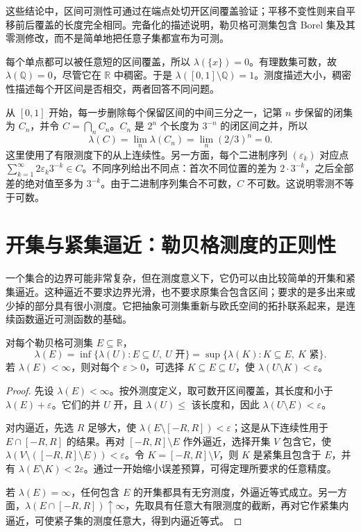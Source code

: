 这些结论中，区间可测性可通过在端点处切开区间覆盖验证；平移不变性则来自平移前后覆盖的长度完全相同。完备化的描述说明，勒贝格可测集包含 Borel 集及其零测修改，而不是简单地把任意子集都宣布为可测。

\begin{example}[稠密性与测度大小无关]
每个单点都可以被任意短的区间覆盖，所以 $\lambda(\{x\})=0$。有理数集可数，故 $\lambda(\mathbb Q)=0$，尽管它在 $\mathbb R$ 中稠密。于是 $\lambda([0,1]\setminus\mathbb Q)=1$。测度描述大小，稠密性描述每个开区间是否相交，两者回答不同问题。
\end{example}

\begin{example}[不可数的零测集]
从 $[0,1]$ 开始，每一步删除每个保留区间的中间三分之一，记第 $n$ 步保留的闭集为 $C_n$，并令 $C=\bigcap_nC_n$。$C_n$ 是 $2^n$ 个长度为 $3^{-n}$ 的闭区间之并，所以
\[
 \lambda(C)=\lim_n\lambda(C_n)=\lim_n(2/3)^n=0.
\]
这里使用了有限测度下的从上连续性。另一方面，每个二进制序列 $(\varepsilon_k)$ 对应点 $\sum_{k=1}^{\infty}2\varepsilon_k3^{-k}\in C$。不同序列给出不同点：首次不同位置的差为 $2\cdot3^{-k}$，之后全部差的绝对值至多为 $3^{-k}$。由于二进制序列集合不可数，$C$ 不可数。这说明零测不等于可数。
\end{example}

\section{开集与紧集逼近：勒贝格测度的正则性}
\label{sec:mt-regularity}
一个集合的边界可能非常复杂，但在测度意义下，它仍可以由比较简单的开集和紧集逼近。这种逼近不要求边界光滑，也不要求原集合包含区间；要求的是多出来或少掉的部分具有很小测度。它把抽象可测集重新与欧氏空间的拓扑联系起来，是连续函数逼近可测函数的基础。

\begin{theorem}[实轴上勒贝格测度的正则性]
对每个勒贝格可测集 $E\subseteq\mathbb R$，
\[
 \lambda(E)=\inf\{\lambda(U):E\subseteq U,\ U\text{ 开}\}
 =\sup\{\lambda(K):K\subseteq E,\ K\text{ 紧}\}.
\]
若 $\lambda(E)<\infty$，则对每个 $\varepsilon>0$，可选择 $K\subseteq E\subseteq U$，使 $\lambda(U\setminus K)<\varepsilon$。
\label{thm:mt-regularity}
\end{theorem}
\begin{proof}
先设 $\lambda(E)<\infty$。按外测度定义，取可数开区间覆盖，其长度和小于 $\lambda(E)+\varepsilon$。它们的并 $U$ 开，且 $\lambda(U)\leq$ 该长度和，因此 $\lambda(U\setminus E)<\varepsilon$。

对内逼近，先选 $R$ 足够大，使 $\lambda(E\setminus[-R,R])<\varepsilon$；这是从下连续性用于 $E\cap[-R,R]$ 的结果。再对 $[-R,R]\setminus E$ 作外逼近，选择开集 $V$ 包含它，使 $\lambda(V\setminus([-R,R]\setminus E))<\varepsilon$。令 $K=[-R,R]\setminus V$，则 $K$ 是紧集且包含于 $E$，并有 $\lambda(E\setminus K)<2\varepsilon$。通过一开始缩小误差预算，可得定理所要求的任意精度。

若 $\lambda(E)=\infty$，任何包含 $E$ 的开集都具有无穷测度，外逼近等式成立。另一方面，$\lambda(E\cap[-R,R])\uparrow\infty$，先取具有任意大有限测度的截断，再对它作紧集内逼近，可使紧子集的测度任意大，得到内逼近等式。
\end{proof}

